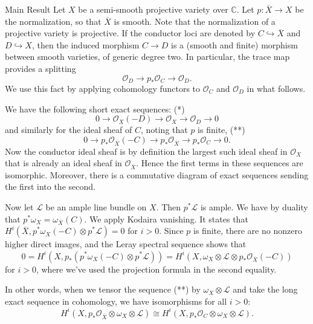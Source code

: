 \documentclass{article}
\begin{document}
\begin{section}{Main Result}  Let $X$ be a semi-smooth projective variety over $\mathbb{C}$.  Let $p:  \overline{X} \rightarrow X$ be the normalization, so that $\overline{X}$ is smooth.  Note that the normalization of a projective variety is projective.  If the conductor loci are denoted by $C \hookrightarrow \overline{X}$ and $D \hookrightarrow X$, then the induced morphism $C \rightarrow D$ is a (smooth and finite) morphism between smooth varieties, of generic degree two.  In particular, the trace map provides a splitting $$\mathcal{O}_D \rightarrow p_*\mathcal{O}_C \rightarrow \mathcal{O}_D.$$  We use this fact by applying cohomology functors to $\mathcal{O}_C$ and $\mathcal{O}_D$ in what follows.

We have the following short exact sequences: (*)  $$   0 \rightarrow \mathcal{O}_X(-D) \rightarrow \mathcal{O}_X \rightarrow \mathcal{O}_D \rightarrow 0$$ and similarly for the ideal sheaf of $C$, noting that $p$ is finite, (**)$$    0 \rightarrow p_*\mathcal{O}_{\overline{X}}(-C) \rightarrow p_*\mathcal{O}_{\overline{X}} \rightarrow p_*\mathcal{O}_C \rightarrow 0.$$  Now the conductor ideal sheaf is by definition the largest such ideal sheaf in $\mathcal{O}_X$ that is already an ideal sheaf in $\mathcal{O}_{\overline{X}}$.  Hence the first terms in these sequences are isomorphic.  Moreover, there is a commutative diagram of exact sequences sending the first into the second.

Now let $\mathcal{L}$ be an ample line bundle on $X$.  Then $p^*\mathcal{L}$ is ample.  We have by duality that $p^*\omega_X = \omega_{\overline{X}}(C).$  We apply Kodaira vanishing.  It states that $H^i(\overline{X}, p^*\omega_X(-C) \otimes p^*\mathcal{L}) = 0$ for $i >0$.  Since $p$ is finite, there are no nonzero higher direct images, and the Leray spectral sequence shows that $$0 = H^i(X, p_*(p^*\omega_X(-C) \otimes p^*\mathcal{L})) = H^i(X, \omega_X \otimes \mathcal{L} \otimes p_*\mathcal{O}_{\overline{X}}(-C))$$ for $i >0$, where we've used the projection formula in the second equality.

In other words, when we tensor the sequence (**) by $\omega_X \otimes \mathcal{L}$ and take the long exact sequence in cohomology, we have isomorphisms for all $i > 0$:  $$H^i(X, p_*\mathcal{O}_{\overline{X}} \otimes \omega_X \otimes \mathcal{L}) \cong H^i(X, p_*\mathcal{O}_C \otimes \omega_X \otimes \mathcal{L}).$$


\end{section}
\end{document}
